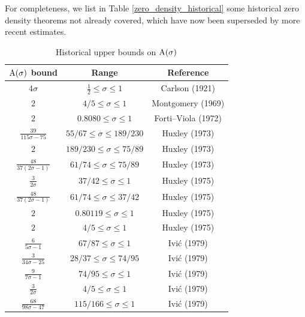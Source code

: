 For completeness, we list in Table \ref{zero_density_historical} some historical zero density theorems not already covered, which have now been superseded by more recent estimates.

\begin{table}[ht]
    \def\arraystretch{1.3}
    \centering
    \caption{Historical upper bounds on $\mathrm{A}(\sigma)$}
    \begin{tabular}{|c|c|c|}
    \hline
    $\mathrm{A}(\sigma)$ bound & Range & Reference\\
    \hline
    $4\sigma$ & $\frac{1}{2} \leq \sigma \le 1$ & Carlson (1921) \cite{carlson_uber_1921}\\
    \hline
    $2$ & $4/5 \leq \sigma \leq 1$ & Montgomery (1969) \cite{montgomery_1969} \\
    \hline
    $2$ & $0.8080 \leq \sigma \leq 1$ & Forti--Viola (1972) \cite{forti-viola} \\
    \hline
    $\frac{39}{115\sigma-75}$ & $55/67 \leq \sigma \leq 189/230$ & Huxley (1973) \cite{huxley_large_1973} \\
    \hline
    $2$ & $189/230 \leq \sigma \leq 75/89$ & Huxley (1973) \cite{huxley_large_1973} \\
    \hline
    $\frac{48}{37(2\sigma-1)}$ & $61/74 \leq \sigma \leq 75/89$ & Huxley (1973) \cite{huxley_large_1973} \\
    \hline
    $\frac{3}{2\sigma}$ & $37/42 \leq \sigma \leq 1$ & Huxley (1975) \cite{huxley_large_1975a}\\
    \hline
    $\frac{48}{37(2\sigma-1)}$ & $61/74 \leq \sigma \leq 37/42$ & Huxley (1975) \cite{huxley_large_1975a}\\
    \hline
    $2$ & $0.80119 \leq \sigma \leq 1$ & Huxley (1975) \cite{huxley_large_1975a}\\
    \hline
    $2$ & $4/5 \leq \sigma \leq 1$ & Huxley (1975) \cite{huxley_large_1975b}\\
    \hline
    $\frac{6}{5\sigma-1}$ & $67/87 \leq \sigma \leq 1$ & Ivi\'c (1979) \cite{ivic_note_1979} \\
    \hline
    $\frac{3}{34\sigma-25}$ & $28/37 \leq \sigma \leq 74/95$ & Ivi\'c (1979) \cite{ivic_note_1979} \\
    \hline
    $\frac{9}{7\sigma-1}$ & $74/95 \leq \sigma \leq 1$ & Ivi\'c (1979) \cite{ivic_note_1979} \\
    \hline
    $\frac{3}{2\sigma}$ & $4/5 \leq \sigma \leq 1$ & Ivi\'c (1979) \cite{ivic_note_1979} \\
    \hline
    $\frac{68}{98\sigma-47}$ & $115/166 \leq \sigma \leq 1$ & Ivi\'c (1979) \cite{ivic_note_1979} \\

\end{tabular}
\end{table}
